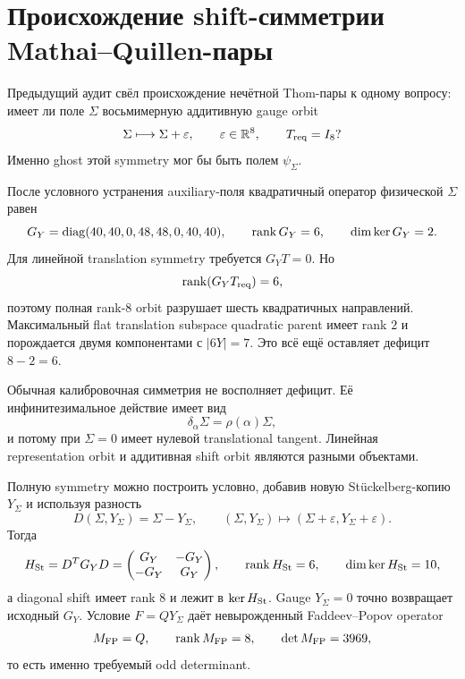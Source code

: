 \chapter{Происхождение shift-симметрии Mathai--Quillen-пары}
\label{ch:v10-h15-r2-mathai-quillen-shift-symmetry-parent}

Предыдущий аудит свёл происхождение нечётной Thom-пары к одному вопросу:
имеет ли поле $\Sigma$ восьмимерную аддитивную gauge orbit
\begin{equation}
 \Sigma\longmapsto\Sigma+\varepsilon,
 \qquad \varepsilon\in\mathbb R^8,
 \qquad T_{\rm req}=I_8?
\end{equation}
Именно ghost этой symmetry мог бы быть полем $\psi_\Sigma$.

После условного устранения auxiliary-поля квадратичный оператор физической
$\Sigma$ равен
\begin{equation}
 G_Y=\operatorname{diag}(40,40,0,48,48,0,40,40),
 \qquad \operatorname{rank} G_Y=6,
 \qquad \dim\ker G_Y=2.
\end{equation}
Для линейной translation symmetry требуется $G_YT=0$. Но
\begin{equation}
 \operatorname{rank}(G_YT_{\rm req})=6,
\end{equation}
поэтому полная rank-$8$ orbit разрушает шесть квадратичных направлений.
Максимальный flat translation subspace quadratic parent имеет rank $2$ и
порождается двумя компонентами с $|6Y|=7$. Это всё ещё оставляет дефицит
$8-2=6$.

Обычная калибровочная симметрия не восполняет дефицит. Её инфинитезимальное
действие имеет вид
\begin{equation}
 \delta_\alpha\Sigma=\rho(\alpha)\Sigma,
\end{equation}
и потому при $\Sigma=0$ имеет нулевой translational tangent. Линейная
representation orbit и аддитивная shift orbit являются разными объектами.

Полную symmetry можно построить условно, добавив новую Stückelberg-копию
$Y_\Sigma$ и используя разность
\begin{equation}
 D(\Sigma,Y_\Sigma)=\Sigma-Y_\Sigma,
 \qquad
 (\Sigma,Y_\Sigma)\mapsto
 (\Sigma+\varepsilon,Y_\Sigma+\varepsilon).
\end{equation}
Тогда
\begin{equation}
 H_{\rm St}=D^TG_YD
 =\begin{pmatrix}G_Y&-G_Y\\-G_Y&G_Y\end{pmatrix},
 \qquad
 \operatorname{rank} H_{\rm St}=6,
 \qquad
 \dim\ker H_{\rm St}=10,
\end{equation}
а diagonal shift имеет rank $8$ и лежит в $\ker H_{\rm St}$. Gauge
$Y_\Sigma=0$ точно возвращает исходный $G_Y$. Условие
$F=QY_\Sigma$ даёт невырожденный Faddeev--Popov operator
\begin{equation}
 M_{\rm FP}=Q,
 \qquad \operatorname{rank} M_{\rm FP}=8,
 \qquad \det M_{\rm FP}=3969,
\end{equation}
то есть именно требуемый odd determinant.

